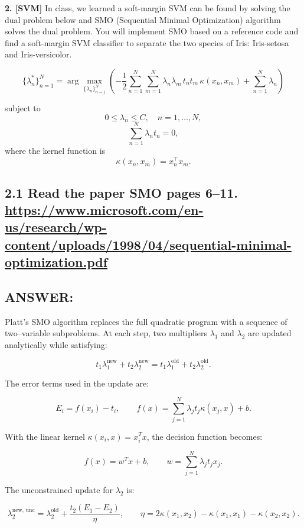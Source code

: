 \documentclass[12pt]{article}
\begin{document}
\vspace{1em}
\vspace{1em}


\newpage\textbf{2. [SVM]} In class, we learned a soft-margin SVM can be found by solving the dual problem below and SMO (Sequential Minimal Optimization) algorithm solves the dual problem. You will implement SMO based on a reference code and find a soft-margin SVM classifier to separate the two species of Iris: Iris-setosa and Iris-versicolor.

\[
\{\lambda_n^*\}_{n=1}^N = \arg\max_{\{\lambda_n\}_{n=1}^N}
\left(
- \frac{1}{2}
\sum_{n=1}^N
\sum_{m=1}^N
\lambda_n \lambda_m \, t_n t_m \, \kappa(x_n, x_m)
+
\sum_{n=1}^N \lambda_n
\right)
\]

subject to
\[
0 \le \lambda_n \le C,\quad n = 1, \dots, N,
\]
\[
\sum_{n=1}^N \lambda_n t_n = 0,
\]
where the kernel function is
\[
\kappa(x_n, x_m) = x_n^\top x_m.
\]

\subsection*{2.1
Read the paper SMO pages 6--11.\\[0.3em]
\url{https://www.microsoft.com/en-us/research/wp-content/uploads/1998/04/sequential-minimal-optimization.pdf}}
\subsection*{ANSWER:}
Platt’s SMO algorithm replaces the full quadratic program with a sequence of
two–variable subproblems. At each step, two multipliers $\lambda_1$ and $\lambda_2$
are updated analytically while satisfying:

\[
t_1 \lambda_1^{\text{new}} + t_2 \lambda_2^{\text{new}}
=
t_1 \lambda_1^{\text{old}} + t_2 \lambda_2^{\text{old}}.
\]

The error terms used in the update are:

\[
E_i = f(x_i) - t_i,
\qquad
f(x) = \sum_{j=1}^N \lambda_j t_j \kappa(x_j, x) + b.
\]

With the linear kernel $\kappa(x_i,x)=x_i^T x$, the decision function becomes:

\[
f(x)=w^T x+b,
\qquad
w=\sum_{j=1}^N \lambda_j t_j x_j.
\]

The unconstrained update for $\lambda_2$ is:

\[
\lambda_2^{\text{new, unc}} = 
\lambda_2^{\text{old}} + 
\frac{t_2(E_1 - E_2)}{\eta},
\qquad
\eta = 2 \kappa(x_1,x_2) - \kappa(x_1,x_1) - \kappa(x_2,x_2).
\]
\end{document}
